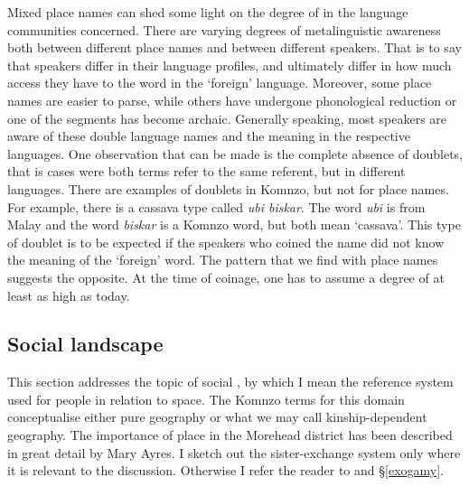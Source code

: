 Mixed place names can shed some light on the degree of  in the language communities concerned. There are varying degrees of metalinguistic awareness both between different place names and between different speakers. That is to say that speakers differ in their language profiles, and ultimately differ in how much access they have to the word in the `foreign' language. Moreover, some place names are easier to parse, while others have undergone phonological reduction or one of the segments has become archaic. Generally speaking, most speakers are aware of these double language names and the meaning in the respective languages. One observation that can be made is the complete absence of doublets, that is cases were both terms refer to the same referent, but in different languages. There are examples of doublets in Komnzo, but not for place names. For example, there is a cassava type called \emph{ubi biskar}. The word \emph{ubi} is from Malay and the word \emph{biskar} is a Komnzo word, but both mean `cassava'. This type of doublet is to be expected if the speakers who coined the name did not know the meaning of the `foreign' word. The pattern that we find with place names suggests the opposite. At the time of coinage, one has to assume a degree of  at least as high as today.

\subsection{Social landscape}\label{sociallandscape}

This section addresses the topic of social , by which I mean the reference system used for people in relation to space. The Komnzo terms for this domain conceptualise either pure geography or what we may call kinship-dependent geography. The importance of place in the Morehead district has been described in great detail by Mary Ayres. I sketch out the sister-exchange system only where it is relevant to the discussion. Otherwise I refer the reader to \citep{Ayres:ws} and \S\ref{exogamy}.%

